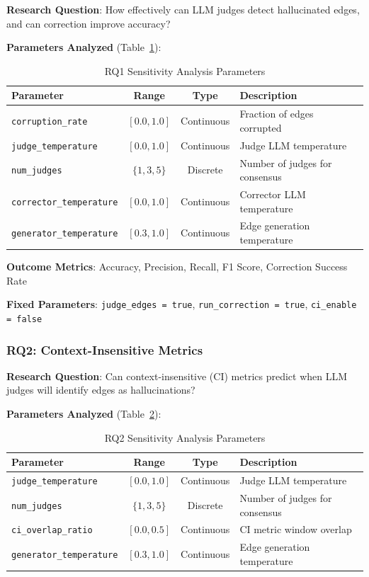 \textbf{Research Question}: How effectively can LLM judges detect hallucinated edges, and can correction improve accuracy?

\textbf{Parameters Analyzed} (Table~\ref{tab:rq1_params}):

\begin{table}[htbp]
\centering
\caption{RQ1 Sensitivity Analysis Parameters}
\label{tab:rq1_params}
\begin{tabular}{lccl}
\toprule
\textbf{Parameter} & \textbf{Range} & \textbf{Type} & \textbf{Description} \\
\midrule
\texttt{corruption\_rate} & $[0.0, 1.0]$ & Continuous & Fraction of edges corrupted \\
\texttt{judge\_temperature} & $[0.0, 1.0]$ & Continuous & Judge LLM temperature \\
\texttt{num\_judges} & $\{1, 3, 5\}$ & Discrete & Number of judges for consensus \\
\texttt{corrector\_temperature} & $[0.0, 1.0]$ & Continuous & Corrector LLM temperature \\
\texttt{generator\_temperature} & $[0.3, 1.0]$ & Continuous & Edge generation temperature \\
\bottomrule
\end{tabular}
\end{table}

\textbf{Outcome Metrics}: Accuracy, Precision, Recall, F1 Score, Correction Success Rate

\textbf{Fixed Parameters}: \texttt{judge\_edges = true}, \texttt{run\_correction = true}, \texttt{ci\_enable = false}

\subsubsection{RQ2: Context-Insensitive Metrics}

\textbf{Research Question}: Can context-insensitive (CI) metrics predict when LLM judges will identify edges as hallucinations?

\textbf{Parameters Analyzed} (Table~\ref{tab:rq2_params}):

\begin{table}[htbp]
\centering
\caption{RQ2 Sensitivity Analysis Parameters}
\label{tab:rq2_params}
\begin{tabular}{lccl}
\toprule
\textbf{Parameter} & \textbf{Range} & \textbf{Type} & \textbf{Description} \\
\midrule
\texttt{judge\_temperature} & $[0.0, 1.0]$ & Continuous & Judge LLM temperature \\
\texttt{num\_judges} & $\{1, 3, 5\}$ & Discrete & Number of judges for consensus \\
\texttt{ci\_overlap\_ratio} & $[0.0, 0.5]$ & Continuous & CI metric window overlap \\
\texttt{generator\_temperature} & $[0.3, 1.0]$ & Continuous & Edge generation temperature \\
\bottomrule
\end{tabular}
\end{table}

